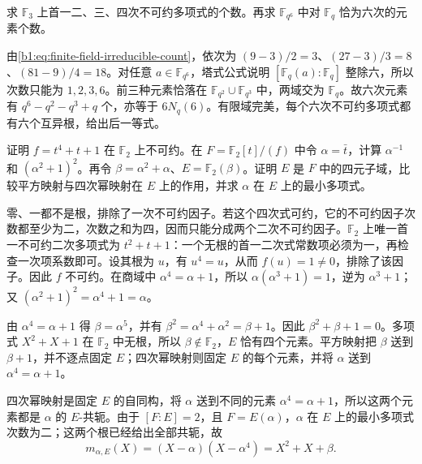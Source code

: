 \begin{exercise}\label{b1:ex:17-irreducible-counts}
	求 \(\mathbb F_3\) 上首一二、三、四次不可约多项式的个数。再求 \(\mathbb F_{q^6}\) 中对 \(\mathbb F_q\) 恰为六次的元素个数。
\end{exercise}
\begin{solution}
	由\eqref{b1:eq:finite-field-irreducible-count}，依次为 \((9-3)/2=3\)、\((27-3)/3=8\)、\((81-9)/4=18\)。对任意 \(a\in\mathbb F_{q^6}\)，塔式公式说明 \([\mathbb F_q(a):\mathbb F_q]\) 整除六，所以次数只能为 \(1,2,3,6\)。前三种元素恰落在 \(\mathbb F_{q^2}\cup\mathbb F_{q^3}\) 中，两域交为 \(\mathbb F_q\)。故六次元素有 \(q^6-q^2-q^3+q\) 个，亦等于 \(6N_q(6)\)。有限域完美，每个六次不可约多项式都有六个互异根，给出后一等式。
\end{solution}

\begin{exercise}\label{b1:ex:17-explicit-sixteen}
	证明 \(f=t^4+t+1\) 在 \(\mathbb F_2\) 上不可约。在 \(F=\mathbb F_2[t]/(f)\) 中令 \(\alpha=\bar t\)，计算 \(\alpha^{-1}\) 和 \((\alpha^2+1)^2\)。再令 \(\beta=\alpha^2+\alpha\)、\(E=\mathbb F_2(\beta)\)。证明 \(E\) 是 \(F\) 中的四元子域，比较平方映射与四次幂映射在 \(E\) 上的作用，并求 \(\alpha\) 在 \(E\) 上的最小多项式。
\end{exercise}
\begin{solution}
	零、一都不是根，排除了一次不可约因子。若这个四次式可约，它的不可约因子次数都至少为二，次数之和为四，因而只能分成两个二次不可约因子。\(\mathbb F_2\) 上唯一首一不可约二次多项式为 \(t^2+t+1\)：一个无根的首一二次式常数项必须为一，再检查一次项系数即可。设其根为 \(u\)，有 \(u^4=u\)，从而 \(f(u)=1\ne0\)，排除了该因子。因此 \(f\) 不可约。在商域中 \(\alpha^4=\alpha+1\)，所以 \(\alpha(\alpha^3+1)=1\)，逆为 \(\alpha^3+1\)；又 \((\alpha^2+1)^2=\alpha^4+1=\alpha\)。

	由 \(\alpha^4=\alpha+1\) 得 \(\beta=\alpha^5\)，并有 \(\beta^2=\alpha^4+\alpha^2=\beta+1\)。因此 \(\beta^2+\beta+1=0\)。多项式 \(X^2+X+1\) 在 \(\mathbb F_2\) 中无根，所以 \(\beta\notin\mathbb F_2\)，\(E\) 恰有四个元素。平方映射把 \(\beta\) 送到 \(\beta+1\)，并不逐点固定 \(E\)；四次幂映射则固定 \(E\) 的每个元素，并将 \(\alpha\) 送到 \(\alpha^4=\alpha+1\)。

	四次幂映射是固定 \(E\) 的自同构，将 \(\alpha\) 送到不同的元素 \(\alpha^4=\alpha+1\)，所以这两个元素都是 \(\alpha\) 的 \(E\)-共轭。由于 \([F:E]=2\)，且 \(F=E(\alpha)\)，\(\alpha\) 在 \(E\) 上的最小多项式次数为二；这两个根已经给出全部共轭，故
	\[
		m_{\alpha,E}(X)=(X-\alpha)(X-\alpha^4)=X^2+X+\beta.
	\]
\end{solution}

